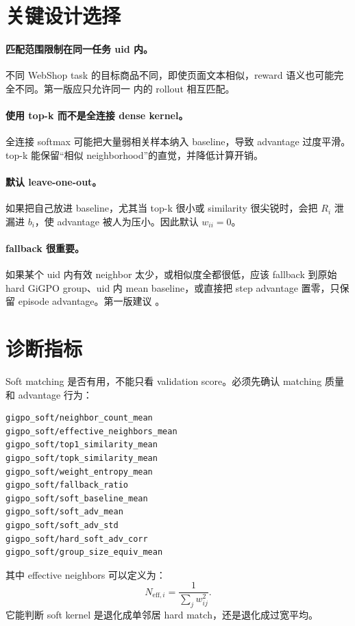\documentclass[10pt]{ctexart}
\begin{document}
\section{关键设计选择}
\paragraph{匹配范围限制在同一任务 uid 内。}不同 WebShop task 的目标商品不同，即使页面文本相似，reward 语义也可能完全不同。第一版应只允许同一  内的 rollout 相互匹配。

\paragraph{使用 top-k 而不是全连接 dense kernel。}全连接 softmax 可能把大量弱相关样本纳入 baseline，导致 advantage 过度平滑。top-k 能保留“相似 neighborhood”的直觉，并降低计算开销。

\paragraph{默认 leave-one-out。}如果把自己放进 baseline，尤其当 top-k 很小或 similarity 很尖锐时，会把 $R_i$ 泄漏进 $b_i$，使 advantage 被人为压小。因此默认 $w_{ii}=0$。

\paragraph{fallback 很重要。}如果某个 uid 内有效 neighbor 太少，或相似度全都很低，应该 fallback 到原始 hard GiGPO group、uid 内 mean baseline，或直接把 step advantage 置零，只保留 episode advantage。第一版建议 。

\section{诊断指标}
Soft matching 是否有用，不能只看 validation score。必须先确认 matching 质量和 advantage 行为：
\begin{lstlisting}
gigpo_soft/neighbor_count_mean
gigpo_soft/effective_neighbors_mean
gigpo_soft/top1_similarity_mean
gigpo_soft/topk_similarity_mean
gigpo_soft/weight_entropy_mean
gigpo_soft/fallback_ratio
gigpo_soft/soft_baseline_mean
gigpo_soft/soft_adv_mean
gigpo_soft/soft_adv_std
gigpo_soft/hard_soft_adv_corr
gigpo_soft/group_size_equiv_mean
\end{lstlisting}

其中 effective neighbors 可以定义为：
\begin{equation}
  N_{\mathrm{eff},i}=\frac{1}{\sum_j w_{ij}^2}.
\end{equation}
它能判断 soft kernel 是退化成单邻居 hard match，还是退化成过宽平均。
\end{document}

